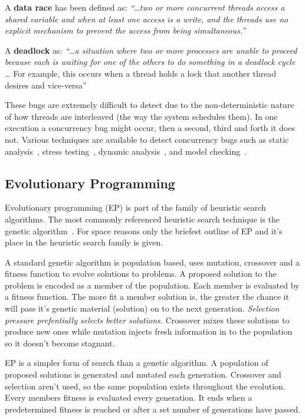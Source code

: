 \documentclass[10pt, conference, compsocconf]{IEEEtran}
\begin{document}
A \textbf{data race} has been defined as: \textit{``\ldots two or more
concurrent threads access a shared variable and when at least one access is a
write, and the threads use no explicit mechanism to prevent the access from
being simultaneous.''}~\cite{LSW07}

A \textbf{deadlock} as: \textit{``\ldots a situation where two or more
processes are unable to proceed because each is waiting for one of the others
to do something in a deadlock cycle \ldots} For example, this occurs when a
thread holds a lock that another thread desires and vice-versa''~\cite{LSW07}

These bugs are extremely difficult to detect due to the non-deterministic
nature of how threads are interleaved (the way the system schedules them). In
one execution a concurrency bug might occur, then a second, third and forth it
does not. Various techniques are available to detect concurrency bugs
such as static analysis~\cite{NA07,NPSG09,HP04}, stress testing~\cite{HSU03},
dynamic analysis~\cite{JNPS09,EFN+02}, and model
checking~\cite{BHPV00,RDH03,OM03,MQB07,Holz97,JM04,HP00}.

\subsection{Evolutionary Programming}
\label{sec:evolutionary_programming}

Evolutionary programming (EP) is part of the family of heuristic search
algorithms. The most commonly referenced heuristic search technique is the
genetic algorithm~\cite{GA92}. For space reasons only the briefest outline of
EP and it's place in the heuristic search family is given.

A standard genetic algorithm is population based, uses mutation, crossover
and a fitness function to evolve solutions to problems. A proposed solution to
the problem is encoded as a member of the population. Each member is evaluated by a
fitness function. The more fit a member solution is, the greater the chance
it will pass it's genetic material (solution) on to the next generation.
\textit{Selection pressure prefentially selects better solutions.} Crossover
mixes these solutions to produce new ones while mutation injects fresh
information in to the population so it doesn't become stagnant.

EP is a simpler form of search than a genetic algorithm. A population of
proposed solutions is generated and mutated each generation.  Crossover and
selection aren't used, so the same population exists throughout the evolution.
Every members fitness is evaluated every generation. It ends when a
predetermined fitness is reached or after a set number of generations have
passed.
\end{document}
